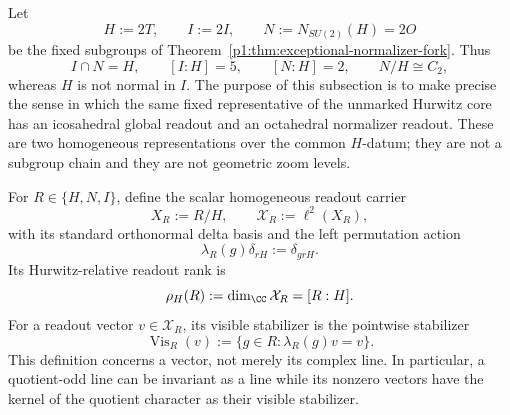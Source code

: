 \documentclass[11pt]{article}
\begin{document}
Let
\[
    H:=2T,
    \qquad
    I:=2I,
    \qquad
    N:=N_{SU(2)}(H)=2O
\]
be the fixed subgroups of
Theorem~\ref{p1:thm:exceptional-normalizer-fork}.  Thus
\[
    I\cap N=H,
    \qquad
    [I:H]=5,
    \qquad
    [N:H]=2,
    \qquad
    N/H\cong C_2,
\]
whereas \(H\) is not normal in \(I\).  The purpose of this subsection is to
make precise the sense in which the same fixed representative of the unmarked Hurwitz core has an
icosahedral global readout and an octahedral normalizer readout.  These are
two homogeneous representations over the common \(H\)-datum; they are not a
subgroup chain and they are not geometric zoom levels.

\begin{definition}
\label{p1:def:homogeneous-core-readout}
For \(R\in\{H,N,I\}\), define the scalar homogeneous readout carrier
\[
    X_R:=R/H,
    \qquad
    \mathcal X_R:=\ell^2(X_R),
\]
with its standard orthonormal delta basis and the left permutation action
\[
    \lambda_R(g)\delta_{rH}:=\delta_{grH}.
\]
Its Hurwitz-relative readout rank is
\[
    \rho_H(R):=\dim_{\CC}\mathcal X_R=[R:H].
\]
For a readout vector \(v\in\mathcal X_R\), its visible stabilizer is the
pointwise stabilizer
\[
    \operatorname{Vis}_R(v)
    :=\{g\in R:\lambda_R(g)v=v\}.
\]
This definition concerns a vector, not merely its complex line.  In
particular, a quotient-odd line can be invariant as a line while its nonzero
vectors have the kernel of the quotient character as their visible
stabilizer.
\end{definition}
\end{document}
